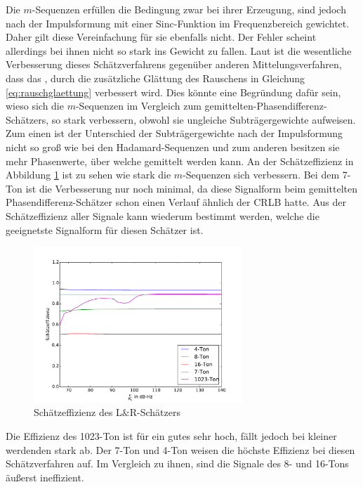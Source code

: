 Die $m$-Sequenzen erfüllen die Bedingung zwar bei ihrer Erzeugung, sind jedoch nach der Impulsformung mit einer Sinc-Funktion im Frequenzbereich gewichtet. Daher gilt diese Vereinfachung für sie ebenfalls nicht. Der Fehler scheint allerdings bei ihnen nicht so stark ins Gewicht zu fallen. Laut \cite[S.90]{mengali1997synchronization} ist die wesentliche Verbesserung dieses Schätzverfahrens gegenüber anderen Mittelungsverfahren, dass das , durch die zusätzliche Glättung des Rauschens in Gleichung \eqref{eq:rauschglaettung} verbessert wird. Dies könnte eine Begründung dafür sein, wieso sich die $m$-Sequenzen im Vergleich zum gemittelten-Phasendifferenz-Schätzers, so stark verbessern, obwohl sie ungleiche Subträgergewichte aufweisen. Zum einen ist der Unterschied der Subträgergewichte nach der Impulsformung nicht so groß wie bei den Hadamard-Sequenzen und zum anderen besitzen sie mehr Phasenwerte, über welche gemittelt werden kann. 
An der Schätzeffizienz in Abbildung \ref{fig:LuRSChätzeffizienz} ist zu sehen wie stark die $m$-Sequenzen sich verbessern. Bei dem 7-Ton ist die Verbesserung nur noch minimal, da diese Signalform beim gemittelten Phasendifferenz-Schätzer schon einen Verlauf ähnlich der \gls{CRLB} hatte.
Aus der Schätzeffizienz aller Signale kann wiederum bestimmt werden, welche die geeignetste Signalform für diesen Schätzer ist. 
\begin{figure}[htbp]
	\centering
	\includegraphics[width = 0.7\textwidth]{images/LuRschaetzeffizienz}
	\caption{Schätzeffizienz des L$\&$R-Schätzers}
	\label{fig:LuRSChätzeffizienz} 
\end{figure}
Die Effizienz des 1023-Ton ist für ein gutes  sehr hoch, fällt jedoch bei kleiner werdenden  stark ab. Der 7-Ton und 4-Ton weisen die höchste Effizienz bei diesen Schätzverfahren auf. Im Vergleich zu ihnen, sind die Signale des 8- und 16-Tons äußerst ineffizient.

